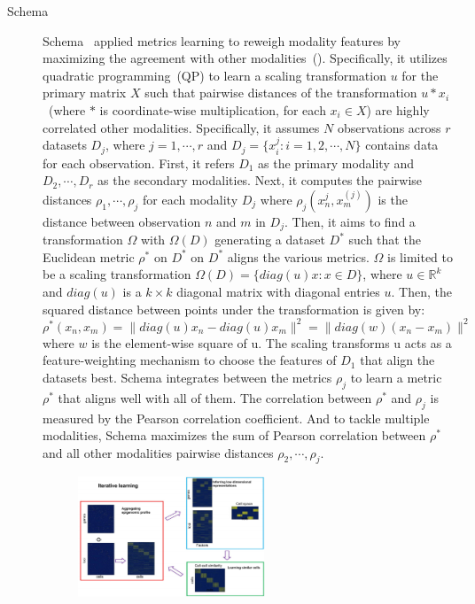 \begin{description}
  \item[Schema]
  Schema~\citep{singh2021schema} applied metrics learning to reweigh modality features by maximizing the agreement with other modalities~(). Specifically, it utilizes quadratic programming~(QP) to learn a scaling transformation $u$ for the primary matrix $X$ such that pairwise distances of the transformation $u * x_i$~(where $*$ is coordinate-wise multiplication, for each $x_i\in X$) are highly correlated other modalities. Specifically, it assumes $N$ observations across $r$ datasets $D_j$, where $j=1,\cdots,r$ and $D_j = \{x_i^{j}: i = 1,2,\cdots,N\}$ contains data for each observation. First, it refers $D_1$ as the primary modality and $D_2,\cdots,D_r$ as the secondary modalities. Next, it computes the pairwise distances $\rho_1,\cdots,\rho_j$ for each modality $D_j$ where $\rho_j(x_n^{j}, x_m^{(j)})$ is the distance between observation $n$ and $m$ in $D_j$. Then, it aims to find a transformation $\Omega$ with $\Omega(D)$ generating a dataset $D^{*}$ such that the Euclidean metric $\rho^{*}$ on $D^{*}$ on $D^{*}$ aligns the various metrics. $\Omega$ is limited to be a scaling transformation $\Omega(D) = \{diag(u)x: x \in D\}$, where $u \in \mathbb{R}^{k}$ and $diag(u)$ is a $k\times k$ diagonal matrix with diagonal entries $u$. Then, the squared distance between points under the transformation is given by:
  \begin{equation}
  \rho^{*}(x_n, x_m) = \|diag(u)x_n - diag(u)x_m\|^2 = \|diag(w)(x_n - x_m)\|^2
  \end{equation}
  where $w$ is the element-wise square of u. The scaling transforms u acts as a feature-weighting mechanism to choose the features of $D_1$ that align the datasets best. Schema integrates between the metrics $\rho_j$ to learn a metric $\rho^{*}$ that aligns well with all of them. The correlation between $\rho^{*}$ and $\rho_j$ is measured by the Pearson correlation coefficient. And to tackle multiple modalities, Schema maximizes the sum of Pearson correlation between $\rho^{*}$ and all other modalities pairwise distances $\rho_2,\cdots,\rho_j$.
\begin{figure}[!h]
  	\centering
  	\includegraphics[width=0.55\textwidth]{Alg_scAI/fig}

\end{figure}
\end{description}
